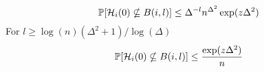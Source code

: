 \begin{corollary}
\label{cor:prob update function time 0 in B(i, l)}
	\begin{equation}
		\mathbb{P}[\mathcal{H}_i(0) \nsubseteq B(i,l)] \leq \Delta^{-l} n^{\Delta^2} \exp(z \Delta^2)
	\end{equation}
	For $l \geq \log(n)(\Delta^2 + 1)/\log(\Delta)$
	\begin{equation}
			\mathbb{P}[\mathcal{H}_i(0) \nsubseteq B(i,l)] \leq \frac{\exp(z \Delta^2)}{n}
	\end{equation}
\end{corollary}



